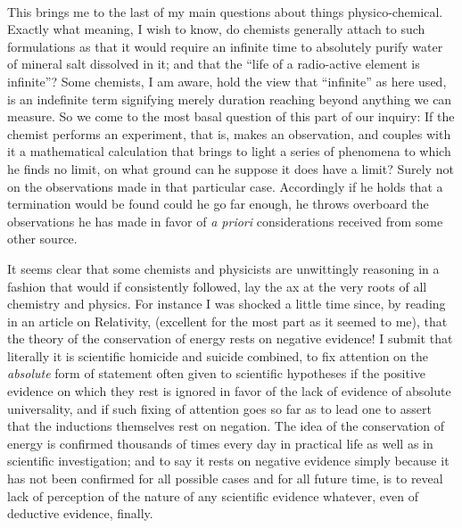 \documentclass[a4paper, 11pt, oneside, polutonikogreek, english]{article}
\begin{document}
\paragraph{}
This brings me to the last of my main questions about things physico-chemical. Exactly what meaning, I wish to know, do chemists generally attach to such formulations as that it would require an infinite time to absolutely purify water of mineral salt dissolved in it; and that the ``life of a radio-active element is infinite''? Some chemists, I am aware, hold the view that ``infinite'' as here used, is an indefinite term signifying merely duration reaching beyond anything we can measure. So we come to the most basal question of this part of our inquiry: If the chemist performs an experiment, that is, makes an observation, and couples with it a mathematical calculation that brings to light a series of phenomena to which he finds no limit, on what ground can he suppose it does have a limit? Surely not on the observations made in that particular case. Accordingly if he holds that a termination would be found could he go far enough, he throws overboard the observations he has made in favor of \emph{a priori} considerations received from some other source.

It seems clear that some chemists and physicists are unwittingly reasoning in a fashion that would if consistently followed, lay the ax at the very roots of all chemistry and physics. For instance I was shocked a little time since, by reading in an article on Relativity, (excellent for the most part as it seemed to me), that the theory of the conservation of energy rests on negative evidence! I submit that literally it is scientific homicide and suicide combined, to fix attention on the \emph{absolute} form of statement often given to scientific hypotheses if the positive evidence on which they rest is ignored in favor of the lack of evidence of absolute universality, and if such fixing of attention goes so far as to lead one to assert that the inductions themselves rest on negation. The idea of the conservation of energy is confirmed thousands of times every day in practical life as well as in scientific investigation; and to say it rests on negative evidence simply because it has not been confirmed for all possible cases and for all future time, is to reveal lack of perception of the nature of any scientific evidence whatever, even of deductive evidence, finally.

\subsection{}
\end{document}

